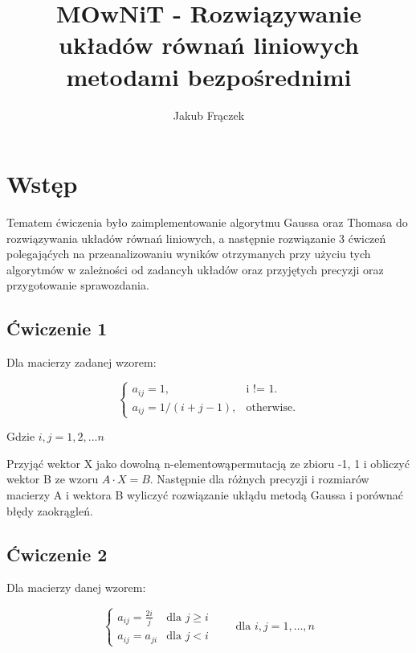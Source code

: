 \documentclass{article}
\title{MOwNiT - Rozwiązywanie układów równań liniowych metodami bezpośrednimi}
\author{Jakub Frączek}
\begin{document}
\maketitle

\section{Wstęp}

Tematem ćwiczenia było zaimplementowanie algorytmu Gaussa oraz Thomasa do rozwiązywania układów równań liniowych, a następnie rozwiązanie 3 ćwiczeń polegająćych na przeanalizowaniu wyników otrzymanych przy użyciu tych algorytmów w zależności od zadancyh układów oraz przyjętych precyzji oraz przygotowanie sprawozdania. 

\subsection{Ćwiczenie 1}

Dla macierzy zadanej wzorem:

\begin{equation}
  \begin{cases}
    a_{ij} = 1 , & \text{i != 1}.\\
    a_{ij} = 1 / (i + j - 1), & \text{otherwise}.
  \end{cases}
\end{equation}

\noindent
Gdzie \(i,j = 1,2,...n\)

\noindent
Przyjąć wektor X jako dowolną n-elementowąpermutacją ze zbioru {-1, 1} i obliczyć wektor B ze wzoru \(A \cdot X = B\). Następnie dla różnych precyzji i rozmiarów macierzy A i wektora B wyliczyć rozwiązanie ukłądu metodą Gaussa i porównać błędy zaokrągleń.

\subsection{Ćwiczenie 2}

\noindent
Dla macierzy danej wzorem:

\begin{equation*}
\left\{
\begin{array}{ll}
a_{ij} = \frac{2i}{j} & \text{dla } j \geq i \\
a_{ij} = a_{ji} & \text{dla } j < i
\end{array}
\right.
\qquad \text{dla } i, j = 1, \ldots, n
\end{equation*}
\end{document}
